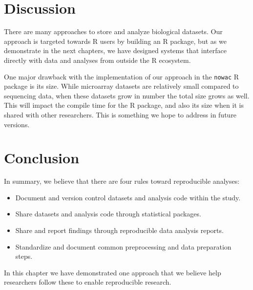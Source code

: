 \section{Discussion}
There are many approaches to store and analyze biological datasets. Our approach
is targeted towards R users by building an R package, but as we demonstrate in
the next chapters, we have designed systems that interface directly with data
and analyses from outside the R ecosystem. 

One major drawback with the implementation of our approach in the \texttt{nowac}
R package is its size. While microarray datasets are relatively small compared
to sequencing data, when these datasets grow in number the total size grows as
well. This will impact the compile time for the R package, and also its size
when it is shared with other researchers. This is something we hope to address
in future versions. 


\section{Conclusion}
In summary, we believe that there are four rules toward reproducible
analyses:
\begin{itemize} 
    \item Document and version control datasets and analysis code within the
        study. 
    \item Share datasets and analysis code through statistical packages. 
    \item Share and report findings through reproducible data analysis reports. 
    \item Standardize and document common preprocessing and data preparation
        steps.
\end{itemize} 

In this chapter we have demonstrated one approach that we believe help
researchers follow these to enable reproducible research. 






